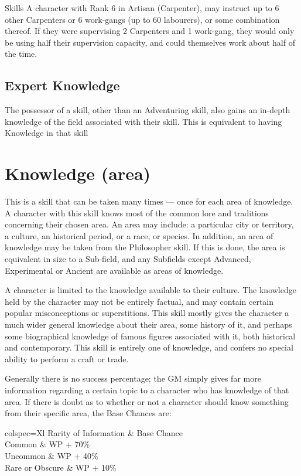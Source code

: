 \begin{Chapter}{Skills}
A character with Rank 6 in Artisan (Carpenter), may instruct up to 6
other Carpenters or 6 work-gangs (up to 60 labourers), or some
combination thereof.  If they were supervising 2 Carpenters and 1
work-gang, they would only be using half their supervision capacity,
and could themselves work about half of the time.

\subsection{Expert Knowledge}

The possessor of a skill, other than an Adventuring skill, also gains
an in-depth knowledge of the field associated with their skill.  This
is equivalent to having Knowledge in that skill

\section{Knowledge (area)}

This is a skill that can be taken many times — once for each area of
knowledge.  A character with this skill knows most of the common lore
and traditions concerning their chosen area. An area may include: a
particular city or territory, a culture, an historical period, or a
race, or species. In addition, an area of knowledge may be taken from
the Philosopher skill. If this is done, the area is equivalent in size
to a Sub-field, and any Subfields except Advanced, Experimental or
Ancient are available as areas of knowledge.

A character is limited to the knowledge available to their
culture. The knowledge held by the character may not be entirely
factual, and may contain certain popular misconceptions or
superstitions.  This skill mostly gives the character a much wider
general knowledge about their area, some history of it, and perhaps
some biographical knowledge of famous figures associated with it, both
historical and contemporary.  This skill is entirely one of knowledge,
and confers no special ability to perform a craft or trade.

Generally there is no success percentage; the GM simply gives far more
information regarding a certain topic to a character who has knowledge
of that area.  If there is doubt as to whether or not a character
should know something from their specific area, the Base Chances are:

\begin{dqtblr}{colspec={Xl}}
Rarity of Information	& Base Chance  \\
Common 			& WP + 70\%  \\
Uncommon 		& WP + 40\%  \\
Rare or Obscure		& WP + 10\% \\
\end{dqtblr}


\end{Chapter}

